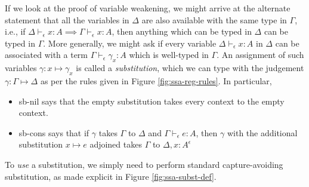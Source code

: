 \documentclass[acmsmall,screen,review]{acmart}
\newcommand{\thyp}[3]{#1 : {#2}^{#3}}
\newcommand{\hasty}[4]{#1 \vdash_{#2} #3: {#4}}
\newcommand{\issubst}[3]{#1: #2 \mapsto #3}
\newcommand{\brle}[1]{{\scriptsize\textsf{#1}}}
\begin{document}
If we look at the proof of variable weakening, we might arrive at the alternate statement that all
the variables in $\Delta$ are also available with the same type in $\Gamma$, i.e., if
$\hasty{\Delta}{\epsilon}{x}{A} \implies \hasty{\Gamma}{\epsilon}{x}{A}$, then anything which can be
typed in $\Delta$ can be typed in $\Gamma$. More generally, we might ask if every variable
$\hasty{\Delta}{\epsilon}{x}{A}$ in $\Delta$ can be associated with a term
$\hasty{\Gamma}{\epsilon}{\gamma_x}{A}$ which is well-typed in $\Gamma$. An assignment of such
variables $\gamma : x \mapsto \gamma_x$ is called a \emph{substitution}, which we can type with the
judgement $\issubst{\gamma}{\Gamma}{\Delta}$ as per the rules given in Figure
\ref{fig:ssa-reg-rules}. In particular,
\begin{itemize}
  \item \brle{sb-nil} says that the empty substitution takes every context to the empty context.
  \item \brle{sb-cons} says that if $\gamma$ takes $\Gamma$ to $\Delta$ and
  $\hasty{\Gamma}{\epsilon}{e}{A}$, then $\gamma$ with the additional substitution $x \mapsto e$
  adjoined takes $\Gamma$ to $\Delta, \thyp{x}{A}{\epsilon}$
\end{itemize}
To \emph{use} a substitution, we simply need to perform standard capture-avoiding substitution, as
made explicit in Figure \ref{fig:ssa-subst-def}.
\end{document}
